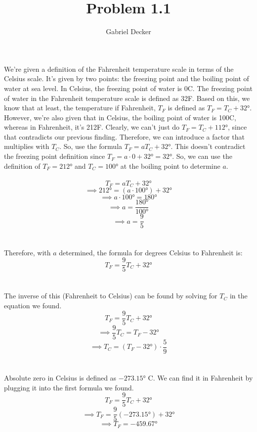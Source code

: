 \documentclass[12pt]{article}
\title{Problem 1.1}
\author{Gabriel Decker}
\newcommand{\degree}{\text{°}}
\begin{document}
\maketitle
\begin{flushleft}

We're given a definition of the Fahrenheit temperature scale in terms of the Celsius scale.
It's given by two points: the freezing point and the boiling point of water at sea level.
In Celsius, the freezing point of water is 0\degree C.
The freezing point of water in the Fahrenheit temperature scale is defined as 32\degree F.
Based on this, we know that at least, the temperature if Fahrenheit, $T_F$ is defined as $T_F=T_C+32\degree$.
However, we're also given that in Celsius, the boiling point of water is 100\degree C, whereas in Fahrenheit, it's 212\degree F.
Clearly, we can't just do $T_F=T_C+112\degree$, since that contradicts our previous finding.
Therefore, we can introduce a factor that multiplies with $T_C$.
So, use the formula $T_F=aT_C+32\degree$.
This doesn't contradict the freezing point definition since $T_F=a\cdot0+32\degree=32\degree$.
So, we can use the definition of $T_F=212\degree$ and $T_C=100\degree$ at the boiling point to determine $a$.\\~\\

$$T_F=aT_C+32\degree$$
$$\implies 212\degree=(a\cdot100\degree)+32\degree$$
$$\implies a\cdot100\degree=180\degree$$
$$\implies a=\frac{180\degree}{100\degree}$$
$$\implies a=\frac{9}{5}$$\\~\\

Therefore, with $a$ determined, the formula for degrees Celsius to Fahrenheit is:
$$T_F=\frac{9}{5}T_C+32\degree$$\\~\\

The inverse of this (Fahrenheit to Celsius) can be found by solving for $T_C$ in the equation we found.
$$T_F=\frac{9}{5}T_C+32\degree$$
$$\implies \frac{9}{5}T_C=T_F-32\degree$$
$$\implies T_C=(T_F-32\degree)\cdot\frac{5}{9}$$\\~\\


Absolute zero in Celsius is defined as $-273.15\degree$ C. We can find it in Fahrenheit by plugging it into the first formula we found.
$$T_F=\frac{9}{5}T_C+32\degree$$
$$\implies T_F=\frac{9}{5}(-273.15\degree)+32\degree$$
$$\implies T_F=-459.67\degree$$





\end{flushleft}
\end{document}
